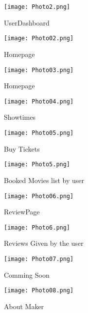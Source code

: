 \documentclass[a4paper,12pt]{article}  %
\begin{document}
\begin{figure}[h!]
    \centering
    \texttt{[image: Photo2.png]}
    \caption{UserDashboard}
    \label{fig:photo02}
\end{figure}
\newpage

\begin{figure}[h!]
    \centering
    \texttt{[image: Photo02.png]}
    \caption{Homepage}
    \label{fig:photo03}
\end{figure}

\begin{figure}[h!]
    \centering
    \texttt{[image: Photo03.png]}
    \caption{Homepage}
    \label{fig:photo04}
\end{figure}
\newpage
\begin{figure}[h!]
    \centering
    \texttt{[image: Photo04.png]}
    \caption{Showtimes}
    \label{fig:photo05}
\end{figure}

\begin{figure}[h!]
    \centering
    \texttt{[image: Photo05.png]}
    \caption{Buy Tickets}
    \label{fig:photo06}
\end{figure}
\newpage





\begin{figure}[h!]
    \centering
    \texttt{[image: Photo5.png]}
    \caption{Booked Movies list by user}
    \label{fig:photo07}
\end{figure}

\begin{figure}[h!]
    \centering
    \texttt{[image: Photo06.png]}
    \caption{ReviewPage}
    \label{fig:photo08}
\end{figure}
\newpage
\begin{figure}[h!]
    \centering
    \texttt{[image: Photo6.png]}
    \caption{Reviews Given by the user}
    \label{fig:photo09}
\end{figure}

\begin{figure}[h!]
    \centering
    \texttt{[image: Photo07.png]}
    \caption{Comming Soon}
    \label{fig:photo10}
\end{figure}
\newpage
\begin{figure}[h!]
    \centering
    \texttt{[image: Photo08.png]}
    \caption{About Maker}
    \label{fig:photo11}
\end{figure}
\end{document}
